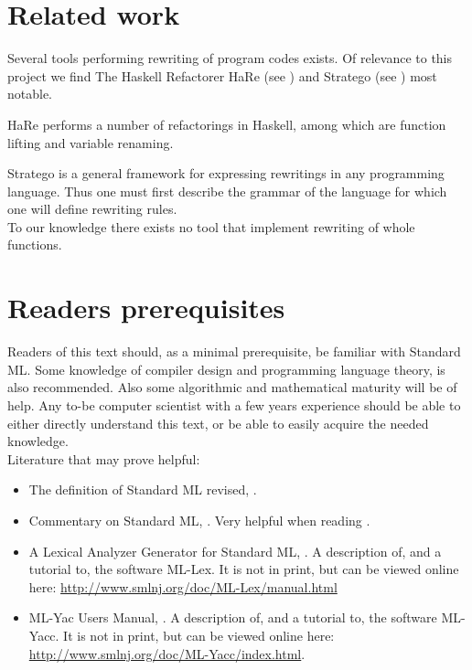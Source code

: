 
\section{Related work}
Several tools performing rewriting of program codes exists. Of relevance to this
project we find The Haskell Refactorer HaRe (see \cite{HARE}) and Stratego (see
\cite{stratego}) most notable.

HaRe performs a number of refactorings in Haskell, among which are function
lifting and variable renaming.

Stratego is a general framework for expressing rewritings in any programming
language. Thus one must first describe the grammar of the language for which one
will define rewriting rules.\\

To our knowledge there exists no tool that implement rewriting of whole
functions.

\section{Readers prerequisites}
Readers of this text should, as a minimal prerequisite, be familiar with
Standard ML. Some knowledge of compiler design and programming language theory,
is also recommended. Also some algorithmic and mathematical maturity will be
of help. Any to-be computer scientist with a few years experience should be able
to either directly understand this text, or be able to easily acquire the needed
knowledge.\\

\noindent
Literature that may prove helpful:

\begin{itemize}
\item The definition of Standard ML revised, \cite{SML97}.
\item Commentary on Standard ML, \cite{SMLCOMM}. Very helpful when reading
  \cite{SML97}.
\item A Lexical Analyzer Generator for Standard ML, \cite{MLLEX}. A description
  of, and a tutorial to, the software ML-Lex. It is not in print, but can be
  viewed online here: \url{http://www.smlnj.org/doc/ML-Lex/manual.html}
\item ML-Yac Users Manual, \cite{MLYACC}. A description of, and a tutorial to,
  the software ML-Yacc. It is not in print, but can be viewed online here:\\
  \mbox{\url{http://www.smlnj.org/doc/ML-Yacc/index.html}}.
\end{itemize}

